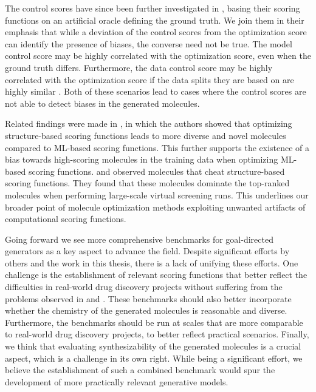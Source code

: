 The control scores have since been further investigated in \citep{gendreauMolecularAssaysSimulator2023},
basing their scoring functions on an artificial oracle defining the ground truth. We join them in
their emphasis that while a deviation of the control scores from the optimization score can identify
the presence of biases, the converse need not be true. The model control score may be highly
correlated with the optimization score, even when the ground truth differs. Furthermore, the data
control score may be highly correlated with the optimization score if the data splits they are based
on are highly similar \citep{langevinExplainingAvoidingFailure2022}. Both of these scenarios lead
to cases where the control scores are not able to detect biases in the generated molecules.

Related findings were made in \citep{thomasReevaluatingSampleEfficiency2022}, in which the authors
showed that optimizing structure-based scoring functions leads to more diverse and novel molecules
compared to \ac{ML}-based scoring functions. This further supports the existence of a bias towards
high-scoring molecules in the training data when optimizing \ac{ML}-based scoring functions.
\citet{lyuModelingExpansionVirtual2023} and \citet{wuIdentifyingArtifactsLarge2024} observed
molecules that cheat structure-based scoring functions. They found that these molecules dominate the
top-ranked molecules when performing large-scale virtual screening runs. This underlines our broader
point of molecule optimization methods exploiting unwanted artifacts of computational scoring
functions.

Going forward we see more comprehensive benchmarks for goal-directed generators as a key aspect to
advance the field. Despite significant efforts by others
\citep{brownGuacaMolBenchmarkingModels2019,polykovskiyMolecularSetsMOSES2020,gaoSynthesizabilityMoleculesProposed2020,gaoSampleEfficiencyMatters2022,thomasMolScoreScoringEvaluation2024}
and the work in this thesis, there is a lack of unifying these efforts. One challenge is the
establishment of relevant scoring functions that better reflect the difficulties in real-world drug
discovery projects \citep{fromerComputeraidedMultiobjectiveOptimization2023} without suffering from
the problems observed in  and
\citep{lyuModelingExpansionVirtual2023,wuIdentifyingArtifactsLarge2024}. These benchmarks should
also better incorporate whether the chemistry of the generated molecules is reasonable
\citep{thomasReevaluatingSampleEfficiency2022} and diverse. Furthermore, the benchmarks should be
run at scales that are more comparable to real-world drug discovery projects, to better reflect
practical scenarios. Finally, we think that evaluating synthesizability of the generated molecules
is a crucial aspect, which is a challenge in its own right. While being a significant effort, we
believe the establishment of such a combined benchmark would spur the development of more
practically relevant generative models.

